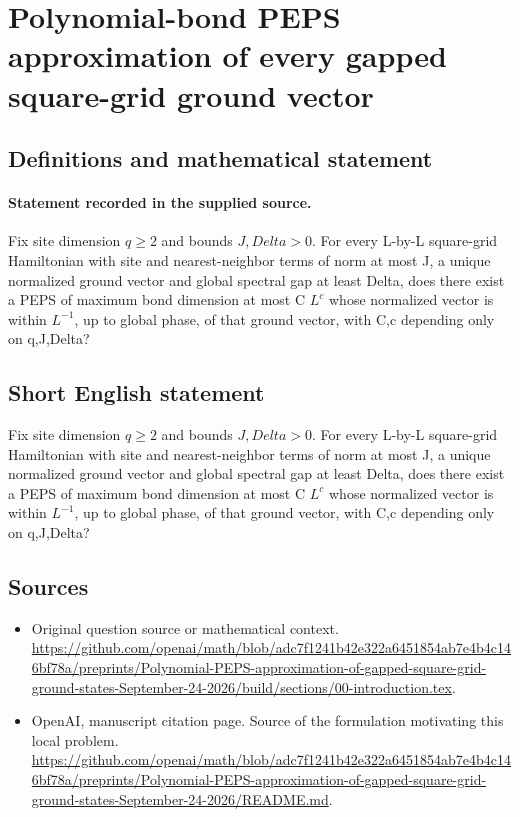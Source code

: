 \documentclass[11pt]{article}
\begin{document}
\section*{Polynomial-bond PEPS approximation of every gapped square-grid ground vector}\label{statement}
\subsection{Definitions and mathematical statement}
\paragraph{Statement recorded in the supplied source.}
Fix site dimension $q\geq 2$ and bounds $J,Delta>0$. For every L-by-L square-grid Hamiltonian with site and nearest-neighbor terms of norm at most J, a unique normalized ground vector and global spectral gap at least Delta, does there exist a PEPS of maximum bond dimension at most C $L^c$ whose normalized vector is within $L^{-1}$, up to global phase, of that ground vector, with C,c depending only on q,J,Delta?
\subsection{Short English statement}
Fix site dimension $q\geq 2$ and bounds $J,Delta>0$. For every L-by-L square-grid Hamiltonian with site and nearest-neighbor terms of norm at most J, a unique normalized ground vector and global spectral gap at least Delta, does there exist a PEPS of maximum bond dimension at most C $L^c$ whose normalized vector is within $L^{-1}$, up to global phase, of that ground vector, with C,c depending only on q,J,Delta?
\subsection{Sources}
\begin{itemize}
\item[S1] Original question source or mathematical context.
\url{https://github.com/openai/math/blob/adc7f1241b42e322a6451854ab7e4b4c146bf78a/preprints/Polynomial-PEPS-approximation-of-gapped-square-grid-ground-states-September-24-2026/build/sections/00-introduction.tex}.
\item[S2] OpenAI, manuscript citation page. Source of the formulation motivating this local problem.
\url{https://github.com/openai/math/blob/adc7f1241b42e322a6451854ab7e4b4c146bf78a/preprints/Polynomial-PEPS-approximation-of-gapped-square-grid-ground-states-September-24-2026/README.md}.
\end{itemize}
\end{document}
